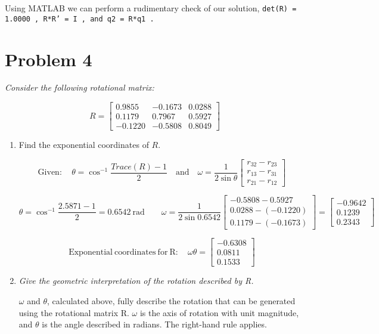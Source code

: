 \documentclass[10pt, oneside, letter]{article}
\begin{document}
	Using MATLAB we can perform a rudimentary check of our solution, \tt det(R) = 1.0000 \rm, \tt R*R' = I \rm, and \tt q2 = R*q1 \rm.
	
\hrulefill	

\section*{Problem 4}

	\it Consider the following rotational matrix:
	
	$$R = \left[ \begin{array}{ccc}
	  0.9855 & -0.1673 & 0.0288 \\
	  0.1179 & 0.7967 & 0.5927 \\
	  -0.1220 & -0.5808 & 0.8049
	\end{array} \right]$$
	
		\begin{enumerate}[label=(\alph*)]
		
		\item Find the exponential coordinates of $R$. \rmfamily
		
		$$\mathrm{Given:} \quad \theta = \cos^{-1} \dfrac{Trace(R)-1}{2} \quad \mathrm{and} \quad \omega = \dfrac{1}{2 \sin \theta} \left[ \begin{array}{ccc}
			  r_{32} - r_{23} \\
			  r_{13} - r_{31} \\
			  r_{21} - r_{12}
			\end{array} \right]$$
			
		$$\theta = \cos^{-1} \dfrac{2.5871-1}{2} = 0.6542 \mathrm{\ rad} \qquad \omega = \dfrac{1}{2 \sin 0.6542} \left[ \begin{array}{ccc}
		 -0.5808 - 0.5927 \\
		 0.0288 - (-0.1220) \\
		 0.1179 - (-0.1673)
		\end{array} \right] = \left[ \begin{array}{r}
		  -0.9642 \\
		  0.1239 \\
		  0.2343
		\end{array} \right]$$
		
		$$\mathrm{Exponential\ coordinates\ for\ R:} \quad \boxed{\omega \theta = \left[ \begin{array}{r}
		  -0.6308 \\
		  0.0811 \\
		  0.1533
		\end{array} \right] }$$
		
		\item \it Give the geometric interpretation of the rotation described by R. \rm
		
		$\omega$ and $\theta$, calculated above, fully describe the rotation that can be generated using the rotational matrix R. $\omega$ is the axis of rotation with unit magnitude, and $\theta$ is the angle described in radians. The right-hand rule applies.
			
		\end{enumerate}
\end{document}
